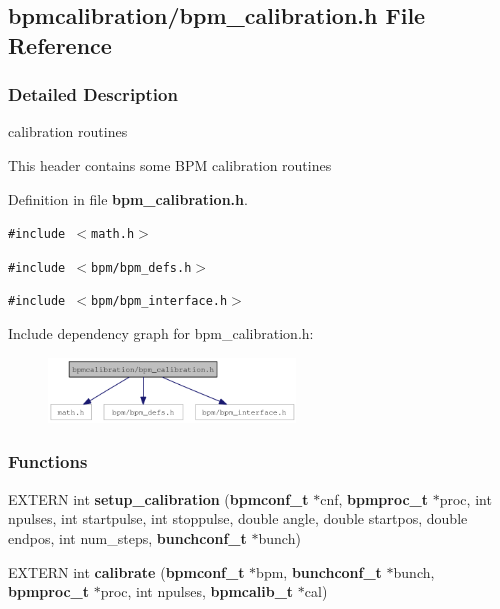 \subsection{bpmcalibration/bpm\_\-calibration.h File Reference}
\label{bpm__calibration_8h}


\subsubsection{Detailed Description}
calibration routines 

This header contains some BPM calibration routines 

Definition in file {\bf bpm\_\-calibration.h}.

{\tt \#include $<$math.h$>$}\par
{\tt \#include $<$bpm/bpm\_\-defs.h$>$}\par
{\tt \#include $<$bpm/bpm\_\-interface.h$>$}\par


Include dependency graph for bpm\_\-calibration.h:\nopagebreak
\begin{figure}[H]
\begin{center}
\leavevmode
\includegraphics[width=186pt]{bpm__calibration_8h__incl}
\end{center}
\end{figure}
\subsubsection*{Functions}
\begin{CompactItemize}
\item 
EXTERN int {\bf setup\_\-calibration} ({\bf bpmconf\_\-t} $\ast$cnf, {\bf bpmproc\_\-t} $\ast$proc, int npulses, int startpulse, int stoppulse, double angle, double startpos, double endpos, int num\_\-steps, {\bf bunchconf\_\-t} $\ast$bunch)
\item 
EXTERN int {\bf calibrate} ({\bf bpmconf\_\-t} $\ast$bpm, {\bf bunchconf\_\-t} $\ast$bunch, {\bf bpmproc\_\-t} $\ast$proc, int npulses, {\bf bpmcalib\_\-t} $\ast$cal)
\end{CompactItemize}
